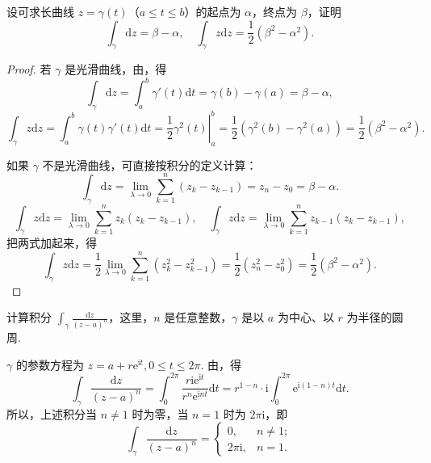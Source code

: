 \documentclass[../../main.tex]{subfiles}
\begin{document}
\begin{example}\label{example:例3.1.3}
设可求长曲线 \( z = \gamma(t) \)（\( a \leqslant t \leqslant b \)）的起点为 \( \alpha \)，终点为 \( \beta \)，证明
\[
\int_\gamma \mathrm{d}z = \beta - \alpha,
\quad
\int_\gamma z \mathrm{d}z = \frac{1}{2}(\beta^2 - \alpha^2).
\]
\end{example}
\begin{proof}
若 \( \gamma \) 是光滑曲线，由，得
\[
\int_\gamma \mathrm{d}z = \int_a^b \gamma'(t)\mathrm{d}t
= \gamma(b) - \gamma(a)
= \beta - \alpha,
\]
\[
\int_\gamma z \mathrm{d}z = \int_a^b \gamma(t)\gamma'(t)\mathrm{d}t
= \left. \frac{1}{2}\gamma^2(t) \right|_a^b
= \frac{1}{2}(\gamma^2(b) - \gamma^2(a))
= \frac{1}{2}(\beta^2 - \alpha^2).
\]

如果 \( \gamma \) 不是光滑曲线，可直接按积分的定义计算：
\[
\int_\gamma \mathrm{d}z = \lim_{\lambda \to 0} \sum_{k = 1}^n (z_k - z_{k - 1})
= z_n - z_0
= \beta - \alpha.
\]
\[
\int_\gamma z \mathrm{d}z = \lim_{\lambda \to 0} \sum_{k = 1}^n z_k(z_k - z_{k - 1}),
\quad
\int_\gamma z \mathrm{d}z = \lim_{\lambda \to 0} \sum_{k = 1}^n z_{k - 1}(z_k - z_{k - 1}),
\]
把两式加起来，得
\[
\int_\gamma z \mathrm{d}z = \frac{1}{2} \lim_{\lambda \to 0} \sum_{k = 1}^n (z_k^2 - z_{k - 1}^2)
= \frac{1}{2}(z_n^2 - z_0^2)
= \frac{1}{2}(\beta^2 - \alpha^2).
\]

\end{proof}

\begin{example}\label{example:例3.1.4}
计算积分 \( \int_\gamma \frac{\mathrm{d}z}{(z - a)^n} \)，这里，\( n \) 是任意整数，\( \gamma \) 是以 \( a \) 为中心、以 \( r \) 为半径的圆周.
\end{example}
\begin{solution}
\( \gamma \) 的参数方程为 \( z = a + r\mathrm{e}^{\mathrm{i}t}, 0 \leqslant t \leqslant 2\pi \). 由，得
\[
\int_\gamma \frac{\mathrm{d}z}{(z - a)^n} = \int_0^{2\pi} \frac{r\mathrm{i}\mathrm{e}^{\mathrm{i}t}}{r^n\mathrm{e}^{\mathrm{i}nt}}\mathrm{d}t
= r^{1 - n}\cdot \mathrm{i}\int_0^{2\pi} \mathrm{e}^{\mathrm{i}(1 - n)t}\mathrm{d}t.
\]
所以，上述积分当 \( n \neq 1 \) 时为零，当 \( n = 1 \) 时为 \( 2\pi\mathrm{i} \)，即
\[
\int_\gamma \frac{\mathrm{d}z}{(z - a)^n} = 
\begin{cases} 
0, & n \neq 1; \\
2\pi\mathrm{i}, & n = 1.
\end{cases}
\]

\end{solution}
\end{document}
